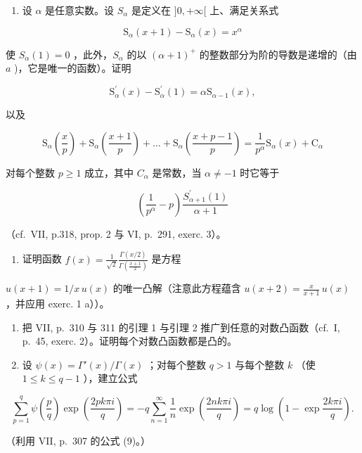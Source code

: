 \begin{enumerate}
\def\labelenumi{\alph{enumi})}
\setcounter{enumi}{1}
\tightlist
\item
  设 \(\alpha\) 是任意实数。设 \(S_{\alpha}\) 是定义在 \(]0, +\infty[\) 上、满足关系式
\end{enumerate}

\[
\mathrm{S} _ {\alpha} (x + 1) - \mathrm{S} _ {\alpha} (x) = x ^ {\alpha}
\]

使 \(S_{\alpha}(1) = 0\) ，此外，\(S_{\alpha}\) 的以 \((\alpha + 1)^{+}\) 的整数部分为阶的导数是递增的（由 \(a\) )，它是唯一的函数）。证明

\[
\mathrm{S} _ {\alpha} ^ {\prime} (x) - \mathrm{S} _ {\alpha} ^ {\prime} (1) = \alpha \mathrm{S} _ {\alpha - 1} (x),
\]

以及

\[
\mathrm{S} _ {\alpha} \left(\frac {x}{p}\right) + \mathrm{S} _ {\alpha} \left(\frac {x + 1}{p}\right) + \dots + \mathrm{S} _ {\alpha} \left(\frac {x + p - 1}{p}\right) = \frac {1}{p ^ {\alpha}} \mathrm{S} _ {\alpha} (x) + \mathrm{C} _ {\alpha}
\]

对每个整数 \(p \geqslant 1\) 成立，其中 \(C_{\alpha}\) 是常数，当 \(\alpha \neq -1\) 时它等于

\[
\left(\frac {1}{p ^ {\alpha}} - p\right) \frac {S _ {\alpha + 1} ^ {\prime} (1)}{\alpha + 1}
\]

（cf.~VII, p.318, prop. 2 与 VI, p.~291, exerc. 3）。

\begin{enumerate}
\def\labelenumi{\arabic{enumi})}
\setcounter{enumi}{3}
\tightlist
\item
  证明函数 \(f(x) = \frac{1}{\sqrt{2}}\frac{\Gamma(x / 2)}{\Gamma\left(\frac{x + 1}{2}\right)}\) 是方程
\end{enumerate}

\(u(x + 1) = 1 / x \, u(x)\) 的唯一凸解（注意此方程蕴含 \(u(x + 2) = \frac{x}{x + 1} \, u(x)\) ，并应用 exerc. 1 a））。

\begin{enumerate}
\def\labelenumi{\arabic{enumi})}
\setcounter{enumi}{4}
\item
  把 VII, p.~310 与 311 的引理 1 与引理 2 推广到任意的对数凸函数（cf.~I, p.~45, exerc. 2）。证明每个对数凸函数都是凸的。
\item
  设 \(\psi(x) = \Gamma'(x)/\Gamma(x)\) ；对每个整数 \(q > 1\) 与每个整数 \(k\) （使 \(1 \leqslant k \leqslant q - 1\) ），建立公式
\end{enumerate}

\[
\sum_ {p = 1} ^ {q} \psi \left(\frac {p}{q}\right) \exp \left(\frac {2 p k \pi i}{q}\right) = - q \sum_ {n = 1} ^ {\infty} \frac {1}{n} \exp \left(\frac {2 n k \pi i}{q}\right) = q \log \left(1 - \exp \frac {2 k \pi i}{q}\right).
\]

（利用 VII, p.~307 的公式 (9)。）

\setcounter{exercisegroup}{1}
